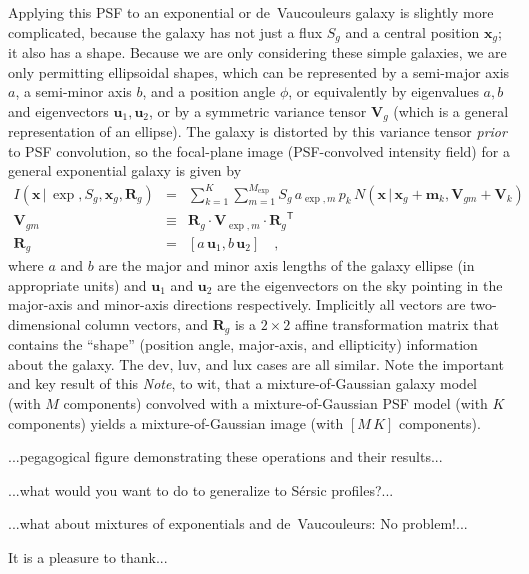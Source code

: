 \documentclass[12pt,pdftex,preprint]{aastex}
\newcommand{\documentname}{\textsl{Note}}
\newcommand{\tmatrix}[1]{\boldsymbol{#1}}
\newcommand{\transpose}[1]{{#1}^{\mathsf T}}
\newcommand{\tvector}[1]{\boldsymbol{#1}}
\newcommand{\pos}{\tvector{x}}
\newcommand{\mean}{\tvector{m}}
\newcommand{\var}{\tmatrix{V}\!}
\newcommand{\affine}{\tmatrix{R}}
\newcommand{\uv}{\tvector{u}}
\newcommand{\normal}{N}
\newcommand{\given}{\,|\,}
\newcommand{\dev}{\mathrm{dev}}
\newcommand{\lux}{\mathrm{lux}}
\newcommand{\luv}{\mathrm{luv}}
\begin{document}
Applying this PSF to an exponential or de~Vaucouleurs galaxy is
slightly more complicated, because the galaxy has not just a flux
$S_g$ and a central position $\pos_g$; it also has a shape.  Because
we are only considering these simple galaxies, we are only permitting
ellipsoidal shapes, which can be represented by a semi-major axis $a$,
a semi-minor axis $b$, and a position angle $\phi$, or equivalently by
eigenvalues $a, b$ and eigenvectors $\uv_1, \uv_2$, or by a symmetric
variance tensor $\var_g$ (which is a general representation of an
ellipse).  The galaxy is distorted by this variance tensor
\emph{prior} to PSF convolution, so the focal-plane image
(PSF-convolved intensity field) for a general exponential galaxy is
given by
\begin{eqnarray}\displaystyle
I(\pos\given\exp,S_g,\pos_g,\affine_g) &=& \sum_{k=1}^K \sum_{m=1}^{M_{\exp}} S_g\,a_{\exp,m}\,p_k\,\normal(\pos\given\pos_g+\mean_k,\var_{gm}+\var_k)
\\
\var_{gm} &\equiv& \affine_g\cdot\var_{\exp,m}\cdot\transpose{\affine_g}
\\
\affine_g &=& \left[a\,\uv_1 , b\,\uv_2 \right]
\quad ,
\end{eqnarray}
where $a$ and $b$ are the major and minor axis lengths of the galaxy
ellipse (in appropriate units) and $\uv_1$ and $\uv_2$ are the
eigenvectors on the sky pointing in the major-axis and minor-axis
directions respectively.  Implicitly all vectors are two-dimensional
column vectors, and $\affine_g$ is a $2\times 2$ affine transformation
matrix that contains the ``shape'' (position angle, major-axis, and
ellipticity) information about the galaxy.  The $\dev$, $\luv$, and
$\lux$ cases are all similar.  Note the important and key result of
this \documentname, to wit, that a mixture-of-Gaussian galaxy model
(with $M$ components) convolved with a mixture-of-Gaussian PSF model
(with $K$ components) yields a mixture-of-Gaussian image (with
$[M\,K]$ components).

...pegagogical figure demonstrating these operations and their results...

...what would you want to do to generalize to S\'ersic profiles?...

...what about mixtures of exponentials and de~Vaucouleurs:  No problem!...

\acknowledgements
It is a pleasure to thank...
\end{document}
